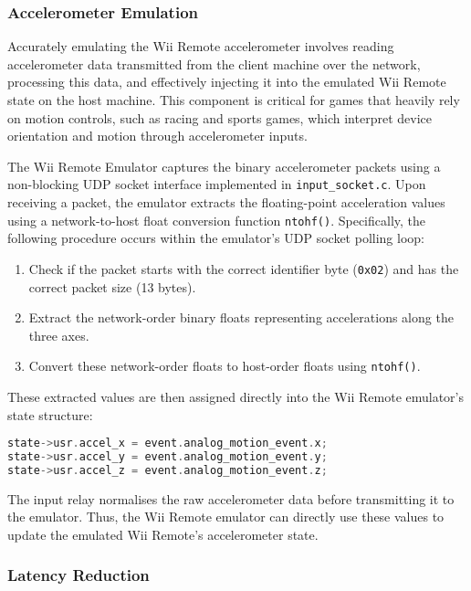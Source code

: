 \subsubsection{Accelerometer Emulation}

Accurately emulating the Wii Remote accelerometer involves reading accelerometer data transmitted from the client machine over the network, processing this data, and effectively injecting it into the emulated Wii Remote state on the host machine. This component is critical for games that heavily rely on motion controls, such as racing and sports games, which interpret device orientation and motion through accelerometer inputs.

The Wii Remote Emulator captures the binary accelerometer packets using a non-blocking UDP socket interface implemented in \texttt{input\_socket.c}. Upon receiving a packet, the emulator extracts the floating-point acceleration values using a network-to-host float conversion function \texttt{ntohf()}. Specifically, the following procedure occurs within the emulator's UDP socket polling loop:

\begin{enumerate}
	\item Check if the packet starts with the correct identifier byte (\texttt{0x02}) and has the correct packet size (13 bytes).
	\item Extract the network-order binary floats representing accelerations along the three axes.
	\item Convert these network-order floats to host-order floats using \texttt{ntohf()}.
\end{enumerate}

These extracted values are then assigned directly into the Wii Remote emulator’s state structure:

\begin{lstlisting}[language=C]
state->usr.accel_x = event.analog_motion_event.x;
state->usr.accel_y = event.analog_motion_event.y;
state->usr.accel_z = event.analog_motion_event.z;
\end{lstlisting}

The input relay normalises the raw accelerometer data before transmitting it to the emulator. Thus, the Wii Remote emulator can directly use these values to update the emulated Wii Remote’s accelerometer state.

\subsubsection{Latency Reduction}


